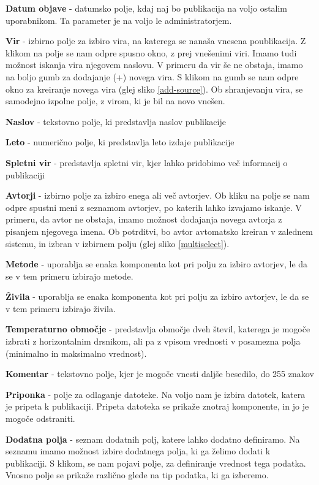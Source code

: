 \documentclass[a4paper, 12pt]{book}
\begin{document}
\begin{description}
  \item \textbf{Datum objave} - datumsko polje, kdaj naj bo publikacija na voljo ostalim uporabnikom. Ta parameter je na voljo le administratorjem.
  \item \textbf{Vir} - izbirno polje za izbiro vira, na katerega se nanaša vnesena poublikacija. Z klikom na polje se nam odpre spusno okno, z prej vnešenimi viri. Imamo tudi možnost iskanja vira njegovem naslovu. V primeru da vir še ne obstaja, imamo na boljo gumb za dodajanje (+) novega vira. S klikom na gumb se nam odpre okno za kreiranje novega vira (glej sliko \ref{add-source}). Ob shranjevanju vira, se samodejno izpolne polje, z virom, ki je bil na novo vnešen.
  \item \textbf{Naslov} - tekstovno polje, ki predstavlja naslov publikacije
  \item \textbf{Leto} - numerično polje, ki predstavlja leto izdaje publikacije
  \item \textbf{Spletni vir} - predstavlja spletni vir, kjer lahko pridobimo več informacij o publikaciji
  \item \textbf{Avtorji} - izbirno polje za izbiro enega ali več avtorjev. Ob kliku na polje se nam odpre spustni meni z seznamom avtorjev, po katerih lahko izvajamo iskanje. V primeru, da avtor ne obstaja, imamo možnost dodajanja novega avtorja z pisanjem njegovega imena. Ob potrditvi, bo avtor avtomatsko kreiran v zalednem sistemu, in izbran v izbirnem polju (glej sliko \ref{multiselect}).
  \item \textbf{Metode} - uporablja se enaka komponenta kot pri polju za izbiro avtorjev, le da se v tem primeru izbirajo metode. 
  \item \textbf{Živila} - uporablja se enaka komponenta kot pri polju za izbiro avtorjev, le da se v tem primeru izbirajo živila.
  \item \textbf{Temperaturno območje} - predstavlja območje dveh števil, katerega je mogoče izbrati z horizontalnim drsnikom, ali pa z vpisom vrednosti v posamezna polja (minimalno in maksimalno vrednost).
  \item \textbf{Komentar} - tekstovno polje, kjer je mogoče vnesti daljše besedilo, do 255 znakov
  \item \textbf{Priponka} - polje za odlaganje datoteke. Na voljo nam je izbira datotek, katera je pripeta k publikaciji. Pripeta datoteka se prikaže znotraj komponente, in jo je mogoče odstraniti.
   \item \textbf{Dodatna polja} - seznam dodatnih polj, katere lahko dodatno definiramo. Na seznamu imamo možnost izbire dodatnega polja, ki ga želimo dodati k publikaciji. S klikom, se nam pojavi polje, za definiranje vrednost tega podatka. Vnosno polje se prikaže različno glede na tip podatka, ki ga izberemo.
\end{description}
\end{document}
